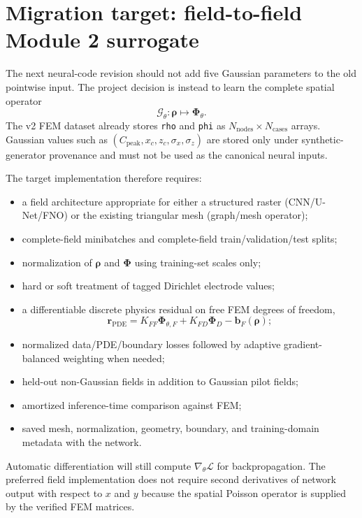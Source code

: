 \documentclass[11pt]{article}
\begin{document}
\section{Migration target: field-to-field Module 2 surrogate}

The next neural-code revision should not add five Gaussian parameters to the old pointwise input. The project decision is instead to learn the complete spatial operator
\begin{equation}
\boxed{\mathcal{G}_{\theta}:\bm{\rho}\mapsto\bm{\Phi}_{\theta}}.
\end{equation}
The v2 FEM dataset already stores \texttt{rho} and \texttt{phi} as $N_{\mathrm{nodes}}\times N_{\mathrm{cases}}$ arrays. Gaussian values such as $(C_{\mathrm{peak}},x_c,z_c,\sigma_x,\sigma_z)$ are stored only under synthetic-generator provenance and must not be used as the canonical neural inputs.

The target implementation therefore requires:
\begin{itemize}[leftmargin=*]
  \item a field architecture appropriate for either a structured raster (CNN/U-Net/FNO) or the existing triangular mesh (graph/mesh operator);
  \item complete-field minibatches and complete-field train/validation/test splits;
  \item normalization of $\bm{\rho}$ and $\bm{\Phi}$ using training-set scales only;
  \item hard or soft treatment of tagged Dirichlet electrode values;
  \item a differentiable discrete physics residual on free FEM degrees of freedom,
  \begin{equation}
  \bm{r}_{\mathrm{PDE}}=K_{FF}\bm{\Phi}_{\theta,F}+K_{FD}\bm{\Phi}_D-\bm{b}_F(\bm{\rho});
  \end{equation}
  \item normalized data/PDE/boundary losses followed by adaptive gradient-balanced weighting when needed;
  \item held-out non-Gaussian fields in addition to Gaussian pilot fields;
  \item amortized inference-time comparison against FEM;
  \item saved mesh, normalization, geometry, boundary, and training-domain metadata with the network.
\end{itemize}

Automatic differentiation will still compute $\nabla_{\theta}\mathcal{L}$ for backpropagation. The preferred field implementation does not require second derivatives of network output with respect to $x$ and $y$ because the spatial Poisson operator is supplied by the verified FEM matrices.
\end{document}
